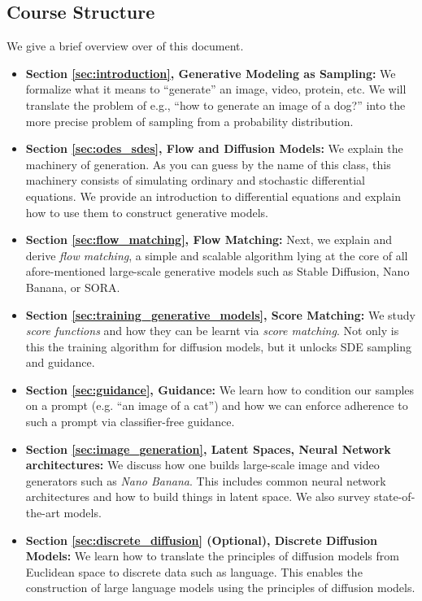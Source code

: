 \subsection{Course Structure}

We give a brief overview over of this document.
\begin{itemize}
\item \textbf{\sffamily Section \ref{sec:introduction}, Generative Modeling as Sampling:} We formalize what it means to ``generate'' an image, video, protein, etc. We will translate the problem of e.g., ``how to generate an image of a dog?'' into the more precise problem of sampling from a probability distribution.
\item \textbf{\sffamily Section \ref{sec:odes_sdes}, Flow and Diffusion Models:} We explain the machinery of generation. As you can guess by the name of this class, this machinery consists of simulating ordinary and stochastic differential equations. We provide an introduction to differential equations and explain how to use them to construct generative models.
\item \textbf{\sffamily Section \ref{sec:flow_matching}, Flow Matching:} Next, we  explain and derive \emph{flow matching}, a simple and scalable algorithm lying at the core of all afore-mentioned large-scale generative models such as Stable Diffusion, Nano Banana, or SORA.
\item \textbf{\sffamily Section \ref{sec:training_generative_models}, Score Matching:} We study \emph{score functions} and how they can be learnt via \emph{score matching}. Not only is this the training algorithm for diffusion models, but it unlocks SDE sampling and guidance.
\item \textbf{\sffamily Section \ref{sec:guidance}, Guidance:} We learn how to condition our samples on a prompt (e.g. ``an image of a cat'') and how we can enforce adherence to such a prompt via classifier-free guidance.
\item  \textbf{\sffamily Section \ref{sec:image_generation}, Latent Spaces, Neural Network architectures:}  We discuss how one builds large-scale image and video generators such as \emph{Nano Banana}. This includes common neural network architectures and how to build things in latent space. We also survey state-of-the-art models.
\item  \textbf{\sffamily Section \ref{sec:discrete_diffusion} (Optional), Discrete Diffusion Models:} We learn how to translate the principles of diffusion models from Euclidean space to discrete data such as language. This enables the construction of large language models using the principles of diffusion models.
\end{itemize}

